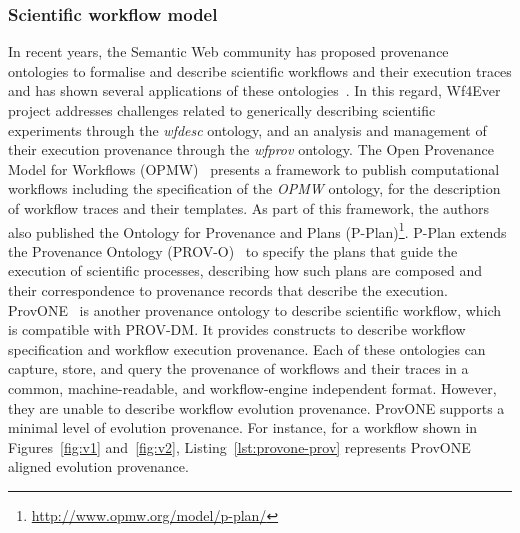 \documentclass[ao]{iosart2x}
\begin{document}
\subsubsection{Scientific workflow model}
\label{subsec:workflow-specification-pattern}

In recent years, the Semantic Web community has proposed provenance ontologies to formalise and describe scientific workflows and their execution traces and has shown several applications of these ontologies~\citep{oliveira2018provenance}. 
In this regard, Wf4Ever~\citep{belhajjame2015using}
project addresses challenges related to generically describing scientific experiments through the \textit{wfdesc} ontology, and an analysis and management of their execution provenance through the \textit{wfprov} ontology.  
The Open Provenance Model for Workflows (OPMW)~\citep{Garijo:2011:NAP:2110497.2110504} presents a framework to publish computational workflows including the specification of the \textit{OPMW} ontology, for the description of workflow traces and their templates.
As part of this framework, the authors also published the Ontology for Provenance and Plans (P-Plan)\footnote{\url{http://www.opmw.org/model/p-plan/}}. P-Plan extends the Provenance Ontology (PROV-O)~\citep{moreau2013PROV} to specify the plans that guide the execution of scientific processes, describing how such plans are composed and their correspondence to provenance records that describe the execution.
ProvONE~\citep{cuevas2016provone} is another provenance ontology to describe scientific workflow, which is compatible with PROV-DM. It provides constructs to describe workflow specification and workflow execution provenance. 
Each of these ontologies can capture, store, and query the provenance of workflows and their traces in a common, machine-readable, and workflow-engine independent format.
However, they are unable to describe workflow evolution provenance. 
ProvONE supports a minimal level of evolution provenance. For instance, for a workflow shown in Figures~\ref{fig:v1} and~\ref{fig:v2}, Listing~\ref{lst:provone-prov} represents ProvONE aligned evolution provenance. 
\end{document}
